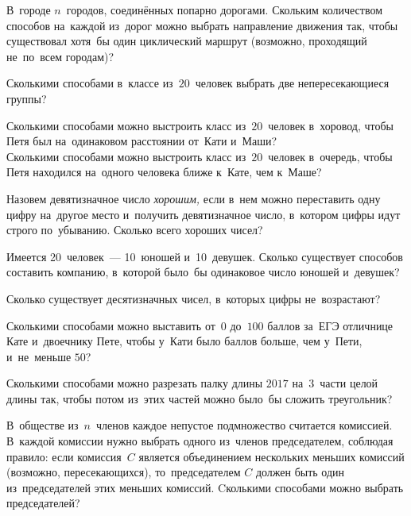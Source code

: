 


\begin{problems}

\item
В~городе $n$~городов, соединённых попарно дорогами.
Скольким количеством способов на~каждой из~дорог можно выбрать направление
движения так, чтобы существовал хотя~бы один циклический маршрут
(возможно, проходящий не~по~всем городам)?

\item
Сколькими способами в~классе из~$20$~человек выбрать две непересекающиеся
группы?

\item
\subproblem
Сколькими способами можно выстроить класс из~$20$~человек в~хоровод, чтобы Петя
был на~одинаковом расстоянии от~Кати и~Маши?
\\
\subproblem
Сколькими способами можно выстроить класс из~$20$~человек в~очередь, чтобы
Петя находился на~одного человека ближе к~Кате, чем к~Маше?

\item
Назовем девятизначное число \emph{хорошим,} если в~нем можно переставить одну
цифру на~другое место и~получить девятизначное число, в~котором цифры идут
строго по~убыванию.
Сколько всего хороших чисел?

\item
Имеется 20~человек~--- 10~юношей и~10~девушек.
Сколько существует способов составить компанию, в~которой было~бы одинаковое
число юношей и~девушек?

\item
Сколько существует десятизначных чисел, в~которых цифры не~возрастают?

\item
Сколькими способами можно выставить от~$0$ до~$100$ баллов за~ЕГЭ
отличнице Кате и~двоечнику Пете, чтобы у~Кати было баллов больше, чем у~Пети,
и~не~меньше $50$?

\item
Сколькими способами можно разрезать палку длины $2017$ на~$3$~части целой длины
так, чтобы потом из~этих частей можно было~бы сложить треугольник?

\item
В~обществе из~$n$~членов каждое непустое подмножество считается комиссией.
В~каждой комиссии нужно выбрать одного из~членов председателем, соблюдая
правило: если комиссия~$C$ является объединением нескольких меньших комиссий
(возможно, пересекающихся), то~председателем $C$ должен быть один
из~председателей этих меньших комиссий.
Cколькими способами можно выбрать председателей?


\end{problems}
